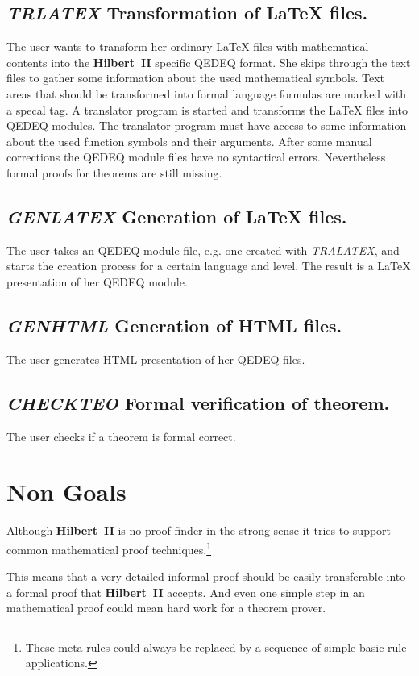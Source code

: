 \documentclass[a4paper,german,10pt,twoside]{book}
\theoremstyle{definition}
\theoremstyle{remark}
\begin{document}
\subsection{\emph{TRLATEX} Transformation of \LaTeX{} files.
}
The user wants to transform her ordinary \LaTeX{} files with mathematical contents into the \textbf{Hilbert~II} specific QEDEQ format. She skips through the text files to gather some information about the used mathematical symbols. Text areas that should be transformed into formal language formulas are marked with a specal tag. A translator program is started and transforms the \LaTeX{} files into QEDEQ modules. The translator program must have access to some information about the used function symbols and their arguments. After some manual corrections the QEDEQ module files have no syntactical errors. Nevertheless formal proofs for theorems are still missing.


\subsection{\emph{GENLATEX} Generation of \LaTeX{} files.
}
The user takes an QEDEQ module file, e.g. one created with \emph{TRALATEX}, and starts the creation process for a certain language and level. The result is a \LaTeX{} presentation of her QEDEQ module.


\subsection{\emph{GENHTML} Generation of HTML files.
}
The user generates HTML presentation of her QEDEQ files.


\subsection{\emph{CHECKTEO} Formal verification of theorem.
}
The user checks if a theorem is formal correct.


\section{Non Goals} \label{chapter3_section2} \hypertarget{chapter3_section2}{}
Although \textbf{Hilbert~II} is no proof finder in the strong sense it tries to support common mathematical proof techniques.\footnote{These meta rules could always be replaced by a sequence of simple basic rule applications.} 

\par
This means that a very detailed informal proof should be easily transferable into a formal proof that \textbf{Hilbert~II} accepts.
And even one simple step in an mathematical proof could mean hard work for a theorem prover.
\end{document}
